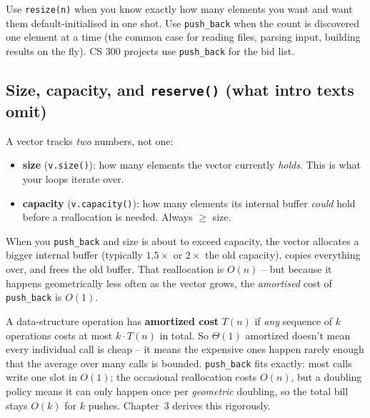 \documentclass[11pt]{article}
\begin{document}
\begin{ideabox}
Use \texttt{resize(n)} when you know exactly how many elements you
want and want them default-initialised in one shot. Use
\texttt{push\_back} when the count is discovered one element at a time
(the common case for reading files, parsing input, building results
on the fly). CS 300 projects use \texttt{push\_back} for the bid list.
\end{ideabox}

\subsection{Size, capacity, and \texttt{reserve()} (what intro texts omit)}

A vector tracks \emph{two} numbers, not one:

\begin{defnbox}
\begin{itemize}
    \item \textbf{size} (\texttt{v.size()}): how many elements the
          vector currently \emph{holds}. This is what your loops
          iterate over.
    \item \textbf{capacity} (\texttt{v.capacity()}): how many elements
          its internal buffer \emph{could} hold before a reallocation
          is needed. Always $\geq$ size.
\end{itemize}
\end{defnbox}

When you \texttt{push\_back} and size is about to exceed capacity, the
vector allocates a bigger internal buffer (typically $1.5\times$ or
$2\times$ the old capacity), copies everything over, and frees the
old buffer. That reallocation is $O(n)$ -- but because it happens
geometrically less often as the vector grows, the \emph{amortised}
cost of \texttt{push\_back} is $O(1)$.

\begin{defnbox}
A data-structure operation has \textbf{amortized cost} $T(n)$ if
\emph{any} sequence of $k$ operations costs at most $k \cdot T(n)$ in
total. So $\Theta(1)$ amortized doesn't mean every individual call is
cheap -- it means the expensive ones happen rarely enough that the
average over many calls is bounded. \texttt{push\_back} fits exactly:
most calls write one slot in $O(1)$; the occasional reallocation costs
$O(n)$, but a doubling policy means it can only happen once per
\emph{geometric} doubling, so the total bill stays $O(k)$ for $k$ pushes.
Chapter~3 derives this rigorously.
\end{defnbox}
\end{document}
